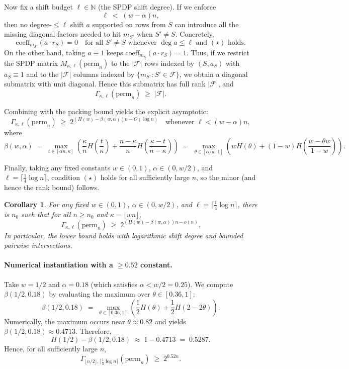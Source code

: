 \documentclass[12pt]{article}
\newtheorem{corollary}[theorem]{Corollary}
\theoremstyle{definition}
\theoremstyle{definition}
\theoremstyle{remark}
\theoremstyle{remark}
\begin{document}
Now fix a shift budget $\ell \in \mathbb{N}$ (the SPDP shift degree). If we enforce
\begin{equation}
\ell \;<\; (w - \alpha) n, \tag{$\star$}
\end{equation}
then no degree-$\leq \ell$ shift $a$ supported on rows from $S$ can introduce all the missing diagonal factors needed to hit $m_{S'}$ when $S' \neq S$. Concretely,
\[
\mathrm{coeff}_{m_{S'}}(a \cdot r_S) = 0 \quad\text{for all } S' \neq S \text{ whenever } \deg a \leq \ell \text{ and } (\star) \text{ holds}.
\]
On the other hand, taking $a \equiv 1$ keeps $\mathrm{coeff}_{m_S}(a \cdot r_S) = 1$. Thus, if we restrict the SPDP matrix $M_{\kappa,\ell}(\mathrm{perm}_n)$ to the $|\mathcal{F}|$ rows indexed by $(S, a_S)$ with $a_S \equiv 1$ and to the $|\mathcal{F}|$ columns indexed by $\{m_{S'} : S' \in \mathcal{F}\}$, we obtain a diagonal submatrix with unit diagonal. Hence this submatrix has full rank $|\mathcal{F}|$, and
\[
\Gamma_{\kappa,\ell}(\mathrm{perm}_n) \;\geq\; |\mathcal{F}|.
\]

Combining with the packing bound yields the explicit asymptotic:
\[
\Gamma_{\kappa,\ell}(\mathrm{perm}_n) \;\geq\; 2^{(H(w) - \beta(w,\alpha))n - O(\log n)} \quad\text{whenever } \ell < (w - \alpha)n,
\]
where
\[
\beta(w,\alpha) \;=\; \max_{t \in [\alpha n, \kappa]} \left( \frac{\kappa}{n} H\!\left(\frac{t}{\kappa}\right) + \frac{n-\kappa}{n} H\!\left(\frac{\kappa-t}{n-\kappa}\right) \right) \;=\; \max_{\theta \in [\alpha/w, 1]} \left( w H(\theta) + (1-w) H\!\left(\frac{w - \theta w}{1-w}\right) \right).
\]

Finally, taking any fixed constants $w \in (0,1)$, $\alpha \in (0, w/2)$, and $\ell = \lceil \frac{1}{4} \log n \rceil$, condition $(\star)$ holds for all sufficiently large $n$, so the minor (and hence the rank bound) follows.

\begin{corollary}\label{cor:shifted-spdp-perm}
For any fixed $w \in (0,1)$, $\alpha \in (0, w/2)$, and $\ell = \lceil \frac{1}{4} \log n \rceil$, there is $n_0$ such that for all $n \geq n_0$ and $\kappa = \lfloor w n \rfloor$,
\[
\Gamma_{\kappa,\ell}(\mathrm{perm}_n) \;\geq\; 2^{(H(w) - \beta(w,\alpha))n - o(n)}.
\]
In particular, the lower bound holds with logarithmic shift degree and bounded pairwise intersections.
\end{corollary}

\paragraph{Numerical instantiation with a $\geq 0.52$ constant.}
Take $w = 1/2$ and $\alpha = 0.18$ (which satisfies $\alpha < w/2 = 0.25$). We compute $\beta(1/2, 0.18)$ by evaluating the maximum over $\theta \in [0.36, 1]$:
\[
\beta(1/2, 0.18) \;=\; \max_{\theta \in [0.36, 1]} \left( \frac{1}{2} H(\theta) + \frac{1}{2} H(2 - 2\theta) \right).
\]
Numerically, the maximum occurs near $\theta \approx 0.82$ and yields $\beta(1/2, 0.18) \approx 0.4713$. Therefore,
\[
H(1/2) - \beta(1/2, 0.18) \;\approx\; 1 - 0.4713 \;=\; 0.5287.
\]
Hence, for all sufficiently large $n$,
\[
\Gamma_{\lfloor n/2 \rfloor, \lceil \frac{1}{4}\log n \rceil}(\mathrm{perm}_n) \;\geq\; 2^{0.52n}.
\]
\end{document}
